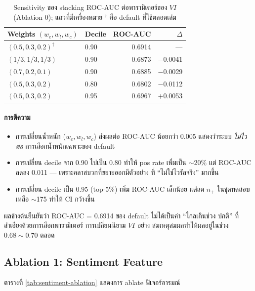 \begin{table}[H]
\centering
\caption{Sensitivity ของ stacking ROC-AUC ต่อพารามิเตอร์ของ $\mathit{VI}$
(Ablation 0); แถวที่มีเครื่องหมาย $^{\dagger}$ คือ default ที่ใช้ตลอดเล่ม}
\label{tab:vi-sensitivity}
\begin{tabularx}{\textwidth}{XXrr}
\toprule
\textbf{Weights $(w_e, w_l, w_c)$} & \textbf{Decile} & \textbf{ROC-AUC} & \textbf{$\Delta$} \\
\midrule
$(0.5, 0.3, 0.2)^{\dagger}$ & 0.90 & 0.6914 & --- \\
$(1/3, 1/3, 1/3)$           & 0.90 & 0.6873 & $-$0.0041 \\
$(0.7, 0.2, 0.1)$           & 0.90 & 0.6885 & $-$0.0029 \\
$(0.5, 0.3, 0.2)$           & 0.80 & 0.6802 & $-$0.0112 \\
$(0.5, 0.3, 0.2)$           & 0.95 & 0.6967 & $+$0.0053 \\
\bottomrule
\end{tabularx}
\end{table}

\paragraph{การตีความ}
\begin{itemize}[leftmargin=2em]
  \item การเปลี่ยนน้ำหนัก ($w_e, w_l, w_c$) ส่งผลต่อ ROC-AUC น้อยกว่า 0.005
        แสดงว่าระบบ \emph{ไม่ไวต่อ} การเลือกน้ำหนักเฉพาะของ default
  \item การเปลี่ยน decile จาก 0.90 ไปเป็น 0.80 ทำให้ pos rate เพิ่มเป็น
        $\sim$20\% แต่ ROC-AUC ลดลง 0.011 — เพราะคลาสบวกที่ขยายออกมีตัวอย่าง
        ที่ ``ไม่ใช่ไวรัลจริง'' มากขึ้น
  \item การเปลี่ยน decile เป็น 0.95 (top-5\%) เพิ่ม ROC-AUC เล็กน้อย แต่ลด
        $n_{+}$ ในชุดทดสอบเหลือ $\sim$175 ทำให้ CI กว้างขึ้น
\end{itemize}

ผลข้างต้นยืนยันว่า ROC-AUC = 0.6914 ของ default ไม่ได้เป็นค่า ``ไกลเกินช่วง
ปกติ'' ที่ลำเอียงด้วยการเลือกพารามิเตอร์ การเปลี่ยนนิยาม $\mathit{VI}$ อย่าง
สมเหตุสมผลทำให้ผลอยู่ในช่วง $0.68 \sim 0.70$ ตลอด

\subsection{Ablation 1: Sentiment Feature}

ตารางที่ \ref{tab:sentiment-ablation} แสดงการ ablate ฟีเจอร์อารมณ์

